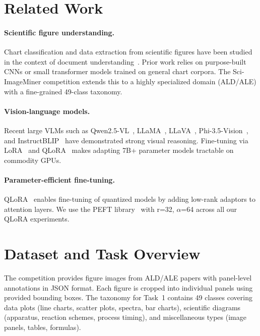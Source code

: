 \documentclass[11pt]{tibop-article}
\begin{document}
\section{Related Work}

\paragraph{Scientific figure understanding.}
Chart classification and data extraction from scientific figures have been studied
in the context of document understanding~\cite{docfigure, aclfig}.
Prior work relies on purpose-built CNNs or small transformer models trained on
general chart corpora.
The Sci-ImageMiner competition extends this to a highly specialized domain
(ALD/ALE) with a fine-grained 49-class taxonomy.

\paragraph{Vision-language models.}
Recent large VLMs such as Qwen2.5-VL~\cite{qwen25vl}, LLaMA~\cite{llama32},
LLaVA~\cite{llava15,llava16}, Phi-3.5-Vision~\cite{phi35vision}, and
InstructBLIP~\cite{instructblip} have demonstrated strong visual reasoning.
Fine-tuning via LoRA~\cite{lora} and QLoRA~\cite{qlora} makes adapting 7B+
parameter models tractable on commodity GPUs.

\paragraph{Parameter-efficient fine-tuning.}
QLoRA~\cite{qlora} enables fine-tuning of quantized models by adding low-rank
adaptors to attention layers.
We use the PEFT library~\cite{peft} with r=32, $\alpha$=64 across all our QLoRA
experiments.


\section{Dataset and Task Overview}

The competition provides figure images from ALD/ALE papers with panel-level
annotations in JSON format.
Each figure is cropped into individual panels using provided bounding boxes.
The taxonomy for Task~1 contains 49 classes covering data plots (line charts,
scatter plots, spectra, bar charts), scientific diagrams (apparatus, reaction
schemes, process timing), and miscellaneous types (image panels, tables, formulas).
\end{document}
